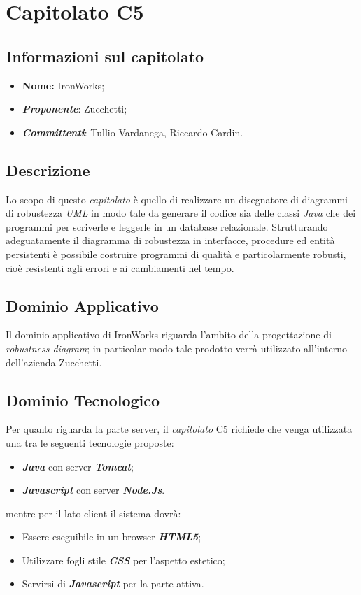 \section{Capitolato C5}
\subsection{Informazioni sul capitolato}
	\begin{itemize}
		\item \textbf{Nome:}
		IronWorks;
		\item \textbf{\textit{Proponente}}:
		Zucchetti;
		\item \textbf{\textit{Committenti}}:
		Tullio Vardanega, Riccardo Cardin.
	\end{itemize}

\subsection{Descrizione}
	Lo scopo di questo \textit{capitolato} è quello di realizzare un disegnatore di diagrammi di robustezza \textit{UML} in modo tale da generare il codice sia delle classi \textit{Java} che dei programmi per scriverle e leggerle in un database relazionale.
	\newline \newline Strutturando adeguatamente il diagramma di robustezza in interfacce, procedure ed entità persistenti è possibile costruire programmi di qualità e particolarmente robusti, cioè resistenti agli errori e ai cambiamenti nel tempo.
	
\subsection{Dominio Applicativo}
	Il dominio applicativo di IronWorks riguarda l'ambito della progettazione di \textit{robustness diagram}; in particolar modo tale prodotto verrà utilizzato all'interno dell'azienda Zucchetti.
	
\subsection{Dominio Tecnologico}
	Per quanto riguarda la parte server, il \textit{capitolato} C5 richiede che venga utilizzata una tra le seguenti tecnologie proposte:
	\begin{itemize}
		\item \textit{\textbf{Java}} con server \textit{\textbf{Tomcat}};
		\item \textit{\textbf{Javascript}} con server \textit{\textbf{Node.Js}}.
	\end{itemize}
	mentre per il lato client il sistema dovrà:
	\begin{itemize}
		\item Essere eseguibile in un browser \textit{\textbf{HTML5}};
		\item Utilizzare fogli stile \textit{\textbf{CSS}} per l’aspetto estetico;
		\item Servirsi di \textit{\textbf{Javascript}} per la parte attiva.
	\end{itemize}
	
